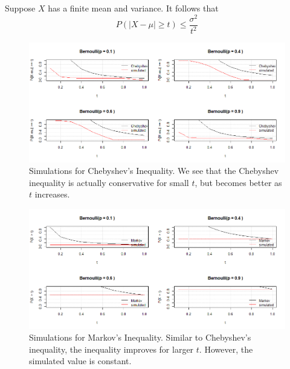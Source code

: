 \begin{tcolorbox}
\begin{proposition}
Suppose $X$ has a finite mean and variance. It follows that 
    \begin{equation}
    P(|X-\mu| \geq t) \leq \frac{\sigma^2}{t^2}
    \end{equation}
\end{proposition}
\end{tcolorbox}

\begin{figure}[H]
    \centering
    \includegraphics[scale=0.7]{Chebyshev.png}
    \caption{Simulations for Chebyshev's Inequality. We see that the Chebyshev inequality is actually conservative for small $t$, but becomes better as $t$ increases. }
    \label{fig:chebyshev_sim}
\end{figure}
\begin{figure}[H]
    \centering
    \includegraphics[scale=0.7]{Markov.png}
    \caption{Simulations for Markov's Inequality. Similar to Chebyshev's inequality, the inequality improves for larger $t$. However, the simulated value is constant.}
    \label{fig:markov_sim}
\end{figure}


